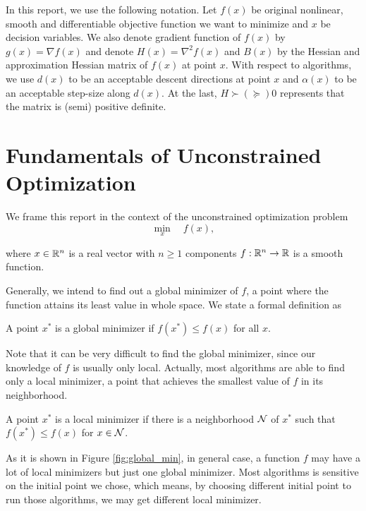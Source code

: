 \documentclass[11pt]{report}
\begin{document}
In this report, we use the following notation. Let $f(x)$ be original nonlinear, smooth and differentiable objective function we want to minimize and $x$ be decision variables. We also denote gradient function of $f(x)$ by $g(x)=\nabla f(x)$ and denote $H(x)=\nabla^2 f(x)$ and $B(x)$ by the Hessian and approximation Hessian matrix of $f(x)$ at point $x$. With respect to algorithms, we use $d(x)$ to be an acceptable descent directions at point $x$ and $\alpha(x)$ to be an acceptable step-size along $d(x)$. At the last, $H\succ(\succeq) 0$ represents that the matrix is (semi) positive definite. 

\chapter{Fundamentals of Unconstrained Optimization}
We frame this report in the context of the unconstrained optimization problem
\begin{equation}
    \min_x \quad f(x),
\end{equation}

where $x\in \mathbb{R}^n$ is a real vector with $n\geq 1$ components $f:\mathbb{R}^n\rightarrow \mathbb{R}$ is a smooth function.

Generally, we intend to find out a global minimizer of $f$, a point where the function attains its least value in whole space. We state a formal definition as
\begin{definition}
    A point $x^*$ is a global minimizer if $f(x^*)\leq f(x)$ for all $x$.
\end{definition}

Note that it can be very difficult to find the global minimizer, since our knowledge of $f$ is usually only local. Actually, most algorithms are able to find only a local minimizer, a point that achieves the smallest value of $f$ in its neighborhood.
\begin{definition}
    A point $x^*$ is a local minimizer if there is a neighborhood ${\cal N}$ of $x^*$ such that $f(x^*)\leq f(x)$ for $x\in {\cal N}$.
\end{definition}

As it is shown in Figure \ref{fig:global_min}, in general case, a function $f$ may have a lot of local minimizers but just one global minimizer. Most algorithms is sensitive on the initial point we chose, which means, by choosing different initial point to run those algorithms, we may get different local minimizer.
\end{document}

